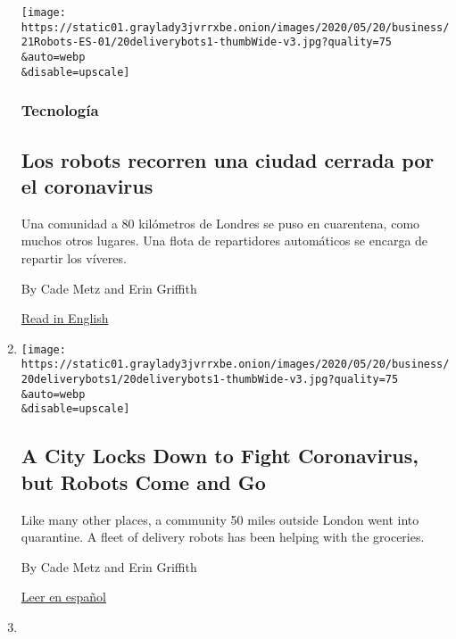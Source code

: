 \begin{enumerate}
  \texttt{[image: https://static01.graylady3jvrrxbe.onion/images/2020/05/20/business/21Robots-ES-01/20deliverybots1-thumbWide-v3.jpg?quality=75\\\&auto=webp\\\&disable=upscale]}

  \hypertarget{tecnologuxeda}{%
  \subsubsection{Tecnología}\label{tecnologuxeda}}

  \hypertarget{los-robots-recorren-una-ciudad-cerrada-por-el-coronavirus}{%
  \subsection{Los robots recorren una ciudad cerrada por el
  coronavirus}\label{los-robots-recorren-una-ciudad-cerrada-por-el-coronavirus}}

  Una comunidad a 80 kilómetros de Londres se puso en cuarentena, como
  muchos otros lugares. Una flota de repartidores automáticos se encarga
  de repartir los víveres.

  By Cade Metz and Erin Griffith

  \href{https://www.nytimes3xbfgragh.onion/2020/05/20/technology/delivery-robots-coronavirus-milton-keynes.html}{Read
  in English}
\item
  \href{/2020/05/20/technology/delivery-robots-coronavirus-milton-keynes.html}{}

  \texttt{[image: https://static01.graylady3jvrrxbe.onion/images/2020/05/20/business/20deliverybots1/20deliverybots1-thumbWide-v3.jpg?quality=75\\\&auto=webp\\\&disable=upscale]}

  \hypertarget{a-city-locks-down-to-fight-coronavirus-but-robots-come-and-go}{%
  \subsection{A City Locks Down to Fight Coronavirus, but Robots Come
  and
  Go}\label{a-city-locks-down-to-fight-coronavirus-but-robots-come-and-go}}

  Like many other places, a community 50 miles outside London went into
  quarantine. A fleet of delivery robots has been helping with the
  groceries.

  By Cade Metz and Erin Griffith

  \href{https://www.nytimes3xbfgragh.onion/es/2020/05/21/espanol/ciencia-y-tecnologia/pandemia-robots-delivery.html}{Leer
  en español}
\item
  \href{/2020/05/12/technology/self-driving-cars-coronavirus.html}{}


\end{enumerate}

